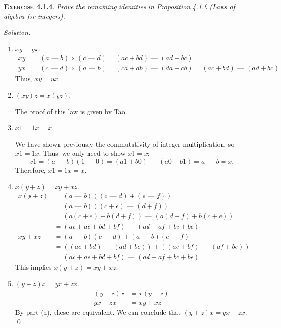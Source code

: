 \documentclass[12pt]{article}
\newcommand{\minus}{\textrm{ --- }}
\theoremstyle{remark}
\newenvironment{exer}[2]{
    \noindent \setlength{\parskip}{1em}%
    \textsc{\textbf{Exercise #1}}. \textit{#2} \par
    \noindent \textit{Solution.} %
}{\bigskip}
\begin{document}
\begin{exer}{4.1.4}{
    Prove the remaining identities in Proposition 4.1.6 (Laws of algebra for integers).
}
\begin{enumerate}[topsep=0mm,label=(\alph*)]
        \item $xy = yx$.
            \begin{align*}
                xy &= (a \minus b) \times (c \minus d) = (ac + bd) \minus (ad + bc) \\
                yx &= (c \minus d) \times (a \minus b) = (ca + db) \minus (da + cb) = (ac + bd) \minus (ad + bc)
            \end{align*}
            Thus, $xy = yx$.

        \item $(xy)z = x(yz)$.

            The proof of this law is given by Tao.
            
        \item $x1 = 1x = x$.
        
            We have shown previously the commutativity of integer multiplication, so $x1 = 1x$.
            Thus, we only need to show $x1 = x$:
            \[
                x1 = (a \minus b)(1 \minus 0) = (a1 + b0) \minus (a0 + b1) = a \minus b = x.
            \]
            Therefore, $x1 = 1x = x$.
            
        \item $x(y + z) = xy + xz$.
            \begin{align*}
                x(y + z)
                &= (a \minus b)((c \minus d) + (e \minus f)) \\
                &= (a \minus b)((c + e) \minus (d + f)) \\
                &= (a(c + e) + b(d + f)) \minus (a(d + f) + b(c + e)) \\
                &= (ac + ae + bd + bf) \minus (ad + af + bc + be) \\
                xy + xz
                &= (a \minus b)(c \minus d) + (a \minus b)(e \minus f) \\
                &= ((ac + bd) \minus (ad + bc)) + ((ae + bf) \minus (af + be)) \\
                &= (ac + ae + bd + bf) \minus (ad + af + bc + be)
            \end{align*}
            This implies $x(y + z) = xy + xz$.
            
        \item $(y + z)x = yx + zx$.
            \begin{align*}
                (y + z)x
                &= x(y + z) \\
                yx + zx
                &= xy + xz
            \end{align*}
            By part (h), these are equivalent. We can conclude that $(y + z)x = yx + zx$. \qed
            
    \end{enumerate}
\end{exer}
\end{document}

